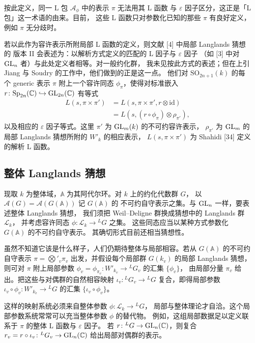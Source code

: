按此定义，同一 L 包 $\mathcal{A}_\phi$ 中的表示 $\pi$ 无法用其 L 函数
与 $\varepsilon$ 因子区分，这正是「L 包」这一术语的由来。目前，
这些 L 函数只对参数化已知的那些 $\pi$ 有良好定义，例如 $\pi$ 无分歧时。

若以此作为容许表示所附局部 L 函数的定义，则文献 [4] 中局部 Langlands 猜想的
版本 II 会表述为：以解析方式定义的匹配的 L 因子与 $\varepsilon$ 因子
（如 [3] 中对 $\mathrm{GL}_n$ 者）与此处定义者相等。对一般约化群，
我未见按此方式的表述；但在上引 Jiang 与 Soudry 的工作中，他们做到的正是这一点。
他们对 $\mathrm{SO}_{2n+1}(k)$ 的每个 generic 表示 $\pi$ 附上一个容许同态
$\phi_\pi$，使得对标准嵌入
$r\colon\mathrm{Sp}_{2n}(\mathbb{C})\hookrightarrow\mathrm{GL}_{2n}(\mathbb{C})$ 有等式
\[
\begin{aligned}
  L(s,\pi\times\pi')
  &=L(s,\pi\times\pi',r\otimes\mathrm{id})\\
  &=L(s,(r\circ\phi_\pi)\otimes\rho_{\pi'}),
\end{aligned}
\]
以及相应的 $\varepsilon$ 因子等式。这里 $\pi'$ 为 $\mathrm{GL}_m(k)$ 的不可约容许表示，
$\rho_{\pi'}$ 为 $\mathrm{GL}_m$ 的局部 Langlands 猜想所附的 $W'_k$ 的相应表示，
$L(s,\pi\times\pi')$ 为 Shahidi [34] 定义的解析 L 函数。

\subsection{整体 Langlands 猜想}

现取 $k$ 为整体域，$\mathbb{A}$ 为其阿代尔环。对 $k$ 上的约化代数群 $G$，
以 $\mathcal{A}(G)=\mathcal{A}(G(\mathbb{A}))$ 记 $G(\mathbb{A})$ 的
不可约自守表示之集。与 $\mathrm{GL}_n$ 一样，要表述整体 Langlands 猜想，
我们须把 Weil--Deligne 群换成猜想中的 Langlands 群 $\mathcal{L}_k$，
并考虑容许同态 $\phi\colon\mathcal{L}_k\to{}^{L}G$ 之集。
这些同态应当以某种方式参数化 $G(\mathbb{A})$ 的不可约自守表示。
其确切形式目前还相当猜想性。

虽然不知道它该是什么样子，人们仍期待整体与局部相容。若从 $G(\mathbb{A})$
的不可约自守表示 $\pi=\bigotimes'_v\pi_v$ 出发，并假设每个局部群 $G(k_v)$
的局部 Langlands 猜想，则可对 $\pi$ 附上局部参数
$\phi_v=\phi_{\pi_v}\colon W'_{k_v}\to{}^{L}G_v$ 的汇集 $\{\phi_v\}$，
由局部分量 $\pi_v$ 给出。把这些与对偶群的自然相容映射
$\iota_v\colon{}^{L}G_v\to{}^{L}G$ 复合，即得局部参数
$\iota_v\circ\phi_v\colon W'_{k_v}\to{}^{L}G$ 的汇集
$\{\iota_v\circ\phi_v\}$。

这样的映射系统必须来自整体参数 $\phi\colon\mathcal{L}_k\to{}^{L}G$，
局部与整体理论才自洽。这个局部参数系统常常可以充当整体参数 $\phi$ 的替代物。
例如，这组局部数据足以定义联系于 $\pi$ 的整体 L 函数与 $\varepsilon$ 因子。
若 $r\colon{}^{L}G\to\mathrm{GL}_n(\mathbb{C})$，则复合
$r_v=r\circ\iota_v\colon{}^{L}G_v\to\mathrm{GL}_n(\mathbb{C})$ 给出局部对偶群的表示。

